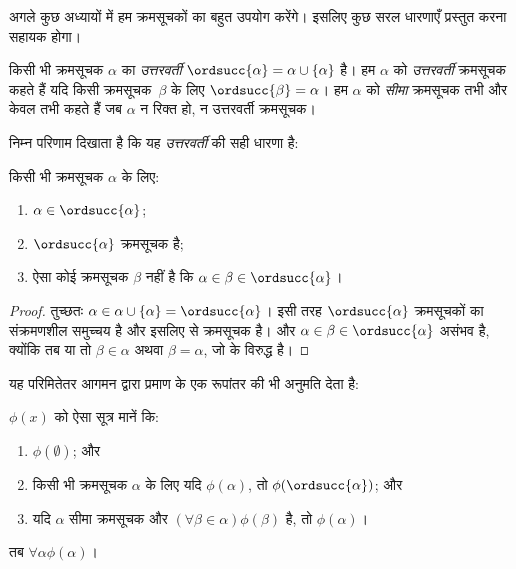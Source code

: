 \documentclass[../../../include/open-logic-section]{subfiles}
\begin{document}

अगले कुछ अध्यायों में हम क्रमसूचकों का बहुत उपयोग करेंगे। इसलिए कुछ सरल
धारणाएँ प्रस्तुत करना सहायक होगा।

\begin{defn}
किसी भी क्रमसूचक $\alpha$ का \emph{उत्तरवर्ती}
$\ordsucc{\alpha} =\alpha \cup \{\alpha\}$ है। हम $\alpha$ को
\emph{उत्तरवर्ती} क्रमसूचक कहते हैं यदि किसी क्रमसूचक~$\beta$ के लिए
$\ordsucc{\beta} = \alpha$। हम $\alpha$ को \emph{सीमा} क्रमसूचक तभी और
केवल तभी कहते हैं जब $\alpha$ न रिक्त हो, न उत्तरवर्ती क्रमसूचक।
\end{defn}
\noindent
निम्न परिणाम दिखाता है कि यह \emph{उत्तरवर्ती} की सही धारणा है:

\begin{prop}
किसी भी क्रमसूचक $\alpha$ के लिए:
\begin{enumerate}
	\item $\alpha \in \ordsucc{\alpha}$;
	\item $\ordsucc{\alpha}$ क्रमसूचक है;
	\item ऐसा कोई क्रमसूचक $\beta$ नहीं है कि
	$\alpha \in \beta \in \ordsucc{\alpha}$।
	\end{enumerate}
\end{prop}

\begin{proof}
तुच्छतः $\alpha \in \alpha \cup \{\alpha\} = \ordsucc{\alpha}$। इसी
तरह $\ordsucc{\alpha}$ क्रमसूचकों का संक्रमणशील समुच्चय है और इसलिए
 से क्रमसूचक है। और
$\alpha \in \beta \in \ordsucc{\alpha}$ असंभव है, क्योंकि तब या तो
$\beta \in \alpha$ अथवा $\beta = \alpha$, जो
 के विरुद्ध है।
\end{proof}
\noindent
यह परिमितेतर आगमन द्वारा प्रमाण के एक रूपांतर की भी अनुमति देता है:

\begin{thm}
$\phi(x)$ को ऐसा सूत्र मानें कि:
\begin{enumerate}
	\item $\phi(\emptyset)$; और
	\item किसी भी क्रमसूचक $\alpha$ के लिए यदि $\phi(\alpha)$, तो
	$\phi(\ordsucc{\alpha})$; और
	\item यदि $\alpha$ सीमा क्रमसूचक और
	$(\forall \beta \in \alpha)\phi(\beta)$ है, तो $\phi(\alpha)$।
\end{enumerate}
तब $\forall \alpha \phi(\alpha)$।
\end{thm}
\end{document}

